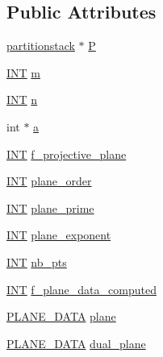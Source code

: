 \subsection*{Public Attributes}
\begin{DoxyCompactItemize}
\item 
\mbox{\hyperlink{classpartitionstack}{partitionstack}} $\ast$ \mbox{\hyperlink{classpoint__line_a4b0739b685ecf93e5adea65beb4273d2}{P}}
\item 
\mbox{\hyperlink{galois_8h_a09fddde158a3a20bd2dcadb609de11dc}{I\+NT}} \mbox{\hyperlink{classpoint__line_ac6adf3376e6e934780d370cd339dd9b4}{m}}
\item 
\mbox{\hyperlink{galois_8h_a09fddde158a3a20bd2dcadb609de11dc}{I\+NT}} \mbox{\hyperlink{classpoint__line_a33a2acf01fef81dd98753038c6cbd890}{n}}
\item 
int $\ast$ \mbox{\hyperlink{classpoint__line_af6f3f31d462677727e21d28dc2e83e5b}{a}}
\item 
\mbox{\hyperlink{galois_8h_a09fddde158a3a20bd2dcadb609de11dc}{I\+NT}} \mbox{\hyperlink{classpoint__line_ab019ae409ff073fd0a280cd6cb1b8f0b}{f\+\_\+projective\+\_\+plane}}
\item 
\mbox{\hyperlink{galois_8h_a09fddde158a3a20bd2dcadb609de11dc}{I\+NT}} \mbox{\hyperlink{classpoint__line_a0a8f10f156717155a5ab0d55cfd6fe02}{plane\+\_\+order}}
\item 
\mbox{\hyperlink{galois_8h_a09fddde158a3a20bd2dcadb609de11dc}{I\+NT}} \mbox{\hyperlink{classpoint__line_a91ab043ca4b86a392c41f60349280ae2}{plane\+\_\+prime}}
\item 
\mbox{\hyperlink{galois_8h_a09fddde158a3a20bd2dcadb609de11dc}{I\+NT}} \mbox{\hyperlink{classpoint__line_abb5d9a5a614f0f161d3e11813fa74659}{plane\+\_\+exponent}}
\item 
\mbox{\hyperlink{galois_8h_a09fddde158a3a20bd2dcadb609de11dc}{I\+NT}} \mbox{\hyperlink{classpoint__line_a4bb61c2ccafcf454744fce9302624215}{nb\+\_\+pts}}
\item 
\mbox{\hyperlink{galois_8h_a09fddde158a3a20bd2dcadb609de11dc}{I\+NT}} \mbox{\hyperlink{classpoint__line_affca8486be846f83bf78f07f0c94c80c}{f\+\_\+plane\+\_\+data\+\_\+computed}}
\item 
\mbox{\hyperlink{incidence_8h_a31e7f5c4dba7bb67b3975bac9f8003c7}{P\+L\+A\+N\+E\+\_\+\+D\+A\+TA}} \mbox{\hyperlink{classpoint__line_a8fe6db044f0866b3271265fe049358c6}{plane}}
\item 
\mbox{\hyperlink{incidence_8h_a31e7f5c4dba7bb67b3975bac9f8003c7}{P\+L\+A\+N\+E\+\_\+\+D\+A\+TA}} \mbox{\hyperlink{classpoint__line_a1ff0a8e475dfbac24c086924f4ff38ac}{dual\+\_\+plane}}

\end{DoxyCompactItemize}
